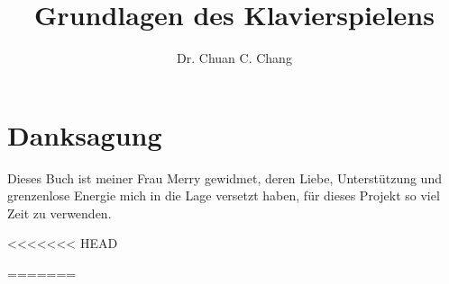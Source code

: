 \documentclass[a4paper]{book}
\title{Grundlagen des Klavierspielens}
\author{Dr. Chuan C. Chang}
\begin{document}
\maketitle

\chapter*{Danksagung}
Dieses Buch ist meiner Frau Merry gewidmet, deren Liebe, Unterstützung und grenzenlose Energie mich in die Lage versetzt haben, für dieses Projekt so viel Zeit zu verwenden.

\tableofcontents

<<<<<<< HEAD





























































\appendix

%

=======


\end{document}
